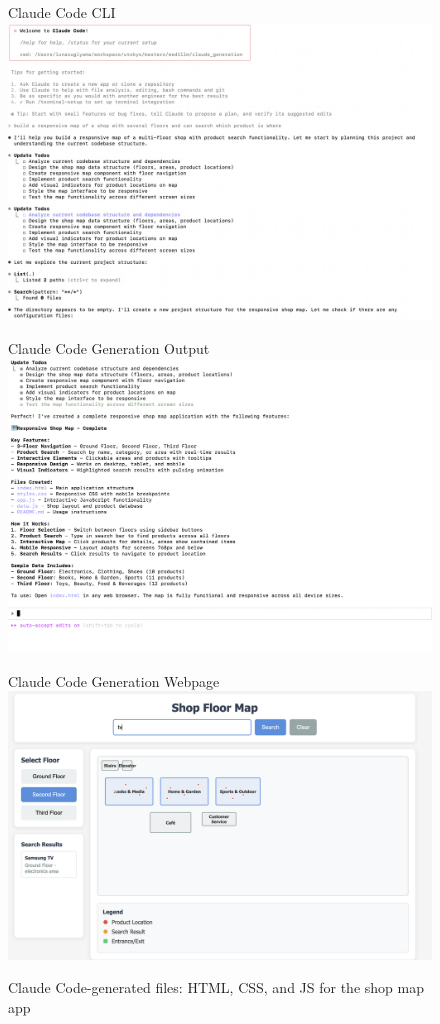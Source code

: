 \documentclass[10pt]{article}
\begin{document}
\begin{figure}[h]
    \centering
    \begin{subcaptionbox}[0.3\linewidth]{Claude Code CLI\label{fig:claude_cli}}
        {\includegraphics[width=0.3\linewidth]{figures/claude_cg_instruction.png}}
    \end{subcaptionbox}
    \hfill
    \begin{subcaptionbox}[0.3\linewidth]{Claude Code Generation Output\label{fig:claude_cg_output}}
        {\includegraphics[width=0.3\linewidth]{figures/claude_cg_output.png}}
    \end{subcaptionbox}
    \hfill
    \begin{subcaptionbox}[0.3\linewidth]{Claude Code Generation Webpage\label{fig:claude_cg_web}}
        {\includegraphics[width=0.3\linewidth]{figures/claude_cg_web.png}}
    \end{subcaptionbox}
    \caption{Claude Code-generated files: HTML, CSS, and JS for the shop map app}
    \label{fig:claude_code_output}
\end{figure}
\end{document}
